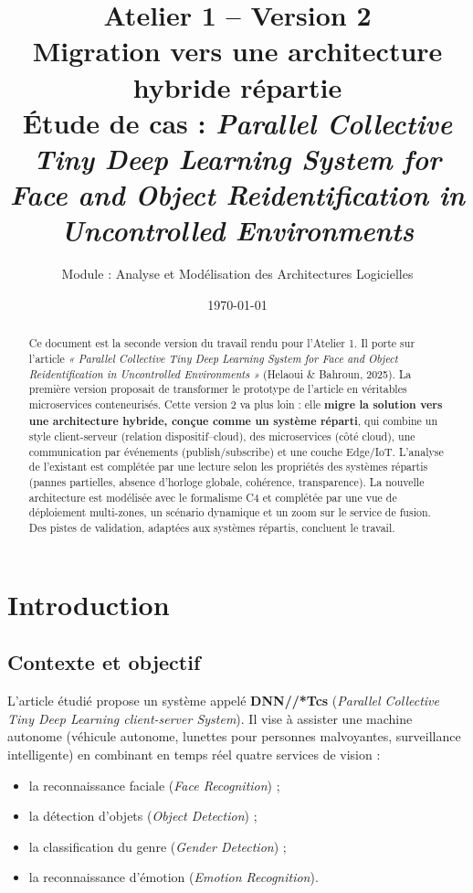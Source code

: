 \documentclass[11pt,a4paper]{article}
\title{\textbf{Atelier 1 -- Version 2 \\ Migration vers une architecture hybride répartie} \\[0.3cm]
\large Étude de cas : \textit{Parallel Collective Tiny Deep Learning System for Face and Object Reidentification in Uncontrolled Environments}}
\author{Module : Analyse et Modélisation des Architectures Logicielles}
\date{\today}
\begin{document}
\maketitle
\thispagestyle{empty}

\begin{abstract}
\noindent Ce document est la seconde version du travail rendu pour l'Atelier 1. Il porte sur l'article \textit{« Parallel Collective Tiny Deep Learning System for Face and Object Reidentification in Uncontrolled Environments »} (Helaoui \& Bahroun, 2025). La première version proposait de transformer le prototype de l'article en véritables microservices conteneurisés. Cette version 2 va plus loin : elle \textbf{migre la solution vers une architecture hybride, conçue comme un système réparti}, qui combine un style client-serveur (relation dispositif--cloud), des microservices (côté cloud), une communication par événements (publish/subscribe) et une couche Edge/IoT. L'analyse de l'existant est complétée par une lecture selon les propriétés des systèmes répartis (pannes partielles, absence d'horloge globale, cohérence, transparence). La nouvelle architecture est modélisée avec le formalisme C4 et complétée par une vue de déploiement multi-zones, un scénario dynamique et un zoom sur le service de fusion. Des pistes de validation, adaptées aux systèmes répartis, concluent le travail.
\end{abstract}

\tableofcontents
\newpage

\section{Introduction}

\subsection{Contexte et objectif}

L'article étudié propose un système appelé \textbf{DNN//*Tcs} (\textit{Parallel Collective Tiny Deep Learning client-server System}). Il vise à assister une machine autonome (véhicule autonome, lunettes pour personnes malvoyantes, surveillance intelligente) en combinant en temps réel quatre services de vision :

\begin{itemize}[nosep]
    \item la reconnaissance faciale (\textit{Face Recognition}) ;
    \item la détection d'objets (\textit{Object Detection}) ;
    \item la classification du genre (\textit{Gender Detection}) ;
    \item la reconnaissance d'émotion (\textit{Emotion Recognition}).
\end{itemize}
\end{document}
